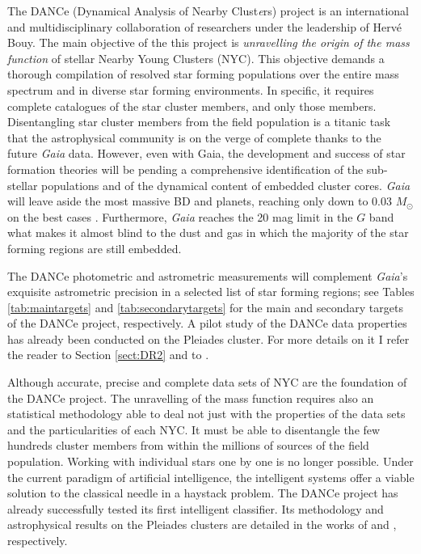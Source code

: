 The DANCe (Dynamical Analysis of Nearby Clust\emph{e}rs) project is an international and multidisciplinary collaboration of researchers under the leadership of Hervé Bouy. The main objective of the this project is \textsl{unravelling the origin of the mass function} of stellar Nearby Young Clusters (NYC). This objective demands a thorough compilation of resolved star forming populations over the entire mass spectrum and in diverse star forming environments. In specific, it requires complete catalogues of the star cluster members, and only those members. Disentangling star cluster members from the field population is a titanic task that the astrophysical community is on the verge of complete thanks to the future \emph{Gaia} \citep{GAIA} data. However, even with Gaia, the development and success of star formation theories will be pending a comprehensive identification of the sub-stellar populations and of the dynamical content of embedded cluster cores. \emph{Gaia} will leave aside the most massive BD and planets, reaching only down to 0.03 $M_{\odot}$ on the best cases \citep{Sarro2013}. Furthermore, \emph{Gaia} reaches the 20 mag limit in the $G$ band \cite[350 nm to 1000 nm][]{2010A&A...523A..48J} what makes it almost blind to the dust and gas in which the majority of the star forming regions are still embedded. 

The DANCe photometric and astrometric measurements will complement \emph{Gaia}'s exquisite astrometric precision in a selected list of star forming regions; see Tables \ref{tab:maintargets} and \ref{tab:secondarytargets} for the main and secondary targets of the DANCe project, respectively. A pilot study of the DANCe data properties has already been conducted on the Pleiades cluster. For more details on it I refer the reader to Section \ref{sect:DR2} and to \citet{Bouy2013}.




Although accurate, precise and complete data sets of NYC are the foundation of the DANCe project. The unravelling of the mass function requires also an statistical methodology able to deal not just with the properties of the data sets and the particularities of each NYC. It must be able to disentangle the few hundreds cluster members from within the millions of sources of the field population. Working with individual stars one by one is no longer possible. Under the current paradigm of artificial intelligence, the intelligent systems offer a viable solution to the classical needle in a haystack problem. The DANCe project has already successfully tested its first intelligent classifier. Its methodology and astrophysical results on the Pleiades clusters are detailed in the works of \citet{Sarro2014} and \citet{Bouy2015}, respectively. 

